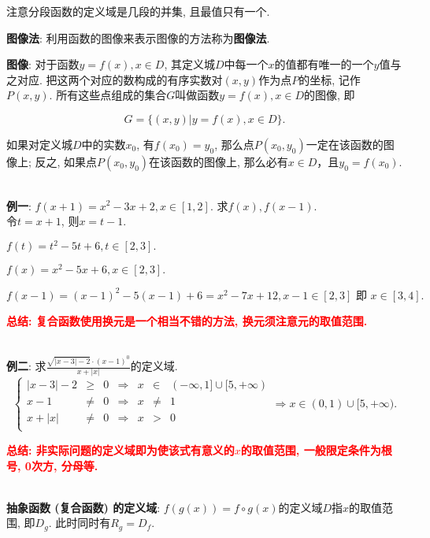 \documentclass[8pt]{article}
\begin{document}
			注意分段函数的定义域是几段的并集, 且最值只有一个.

			\textbf{图像法}: 利用函数的图像来表示图像的方法称为\textbf{图像法}.

			\textbf{图像}: 对于函数$y=f(x), x\in D$, 其定义城$D$中每一个$x$的值都有唯一的一个$y$值与之对应. 把这两个对应的数构成的有序实数对$(x, y)$作为点$P$的坐标, 记作$P(x, y)$. 所有这些点组成的集合$G$叫做函数$y=f(x), x\in D$的图像, 即

			$$
			G=\{(x, y)|y=f(x), x\in D\}.
			$$

			如果对定义城$D$中的实数$x_0$, 有$f(x_0)=y_0$, 那么点$P(x_0, y_0)$一定在该函数的图像上; 反之, 如果点$P(x_0, y_0)$在该函数的图像上, 那么必有$x\in D$，且$y_0=f(x_0)$.

			~\\

			\textbf{例一}: $f(x+1)=x^2-3x+2, x\in [1, 2]$. 求$f(x), f(x-1).$
				~\\

				令$t=x+1$, 则$x=t-1$.

				$f(t)=t^2-5t+6, t\in[2, 3].$

				$f(x)=x^2-5x+6, x\in[2, 3].$

				$f(x-1)=(x-1)^2-5(x-1)+6=x^2-7x+12, x-1\in[2, 3]\text{ 即 }x\in[3, 4].$

				\textbf{\textcolor{red}{总结: 复合函数使用换元是一个相当不错的方法, 换元须注意元的取值范围.}}

			~\\

			\textbf{例二}: 求$\displaystyle \frac{\sqrt{|x-3|-2} \cdot (x-1)^0}{x+|x|}$的定义域.
				~\\

				$$
				\left\{
				\begin{array}{rclcrcl}
					|x-3|-2&\geq&0&\Rightarrow&x&\in&(-\infty, 1]\cup[5, +\infty)\\
					x-1&\neq&0&\Rightarrow&x&\neq&1\\
					x+|x|&\neq&0&\Rightarrow&x&>&0\\
				\end{array}
				\right.
				\Rightarrow
				x\in(0, 1)\cup[5, +\infty).
				$$

				\textbf{\textcolor{red}{总结: 非实际问题的定义域即为使该式有意义的$x$的取值范围, 一般限定条件为根号, 0次方, 分母等.}}

			~\\

			\textbf{抽象函数 (复合函数) 的定义域}: $f(g(x))=f \circ g (x)$的定义域$D$指$x$的取值范围, 即$D_{g}$. 此时同时有$R_{g}=D_{f}.$
\end{document}
